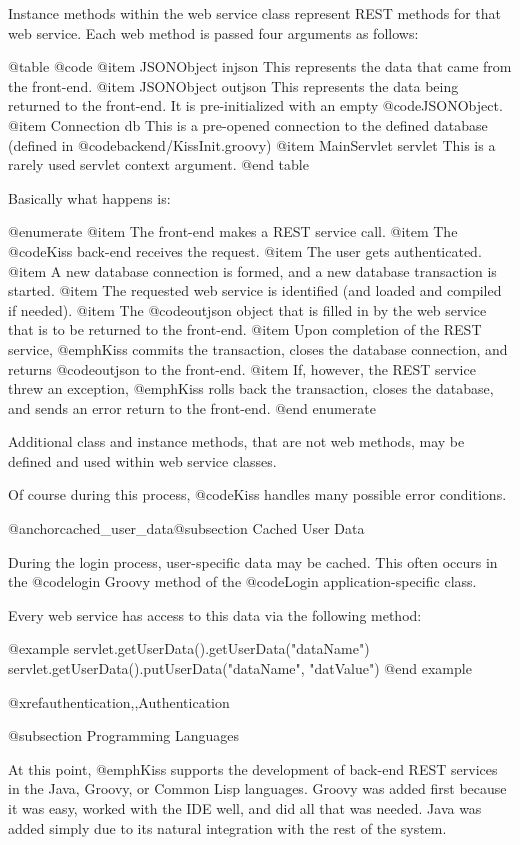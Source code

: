 Instance methods within the web service class represent REST methods
for that web service.  Each web method is passed four arguments as follows:

@table @code
@item JSONObject injson
This represents the data that came from the front-end.
@item JSONObject outjson
This represents the data being returned to the front-end.  It is pre-initialized with an empty @code{JSONObject}.
@item Connection db
This is a pre-opened connection to the defined database (defined in @code{backend/KissInit.groovy})
@item MainServlet servlet
This is a rarely used servlet context argument.
@end table

Basically what happens is:

@enumerate
@item
The front-end makes a REST service call.
@item
The @code{Kiss} back-end receives the request.
@item
The user gets authenticated.
@item
A new database connection is formed, and a new database transaction is started.
@item
The requested web service is identified (and loaded and compiled if needed).
@item
The @code{outjson} object that is filled in by the web service that is to be returned to the front-end.
@item
Upon completion of the REST service, @emph{Kiss} commits the transaction, closes the database connection, and returns @code{outjson} to the front-end.
@item
If, however, the REST service threw an exception, @emph{Kiss} rolls back the transaction, closes the database, and sends an error return to the front-end.
@end enumerate

Additional class and instance methods, that are not web methods, may
be defined and used within web service classes.

Of course during this process, @code{Kiss} handles many possible error conditions.

@anchor{cached_user_data}@subsection Cached User Data

During the login process, user-specific data may be cached.  This
often occurs in the @code{login} Groovy method of the @code{Login}
application-specific class.

Every web service has access to this data via the following method:

@example
        servlet.getUserData().getUserData("dataName")
        servlet.getUserData().putUserData("dataName", "datValue")
@end example

@xref{authentication,,Authentication}

@subsection Programming Languages

At this point, @emph{Kiss} supports the development of back-end REST
services in the Java, Groovy, or Common Lisp languages.  Groovy was
added first because it was easy, worked with the IDE well, and did all
that was needed.  Java was added simply due to its natural integration
with the rest of the system.


